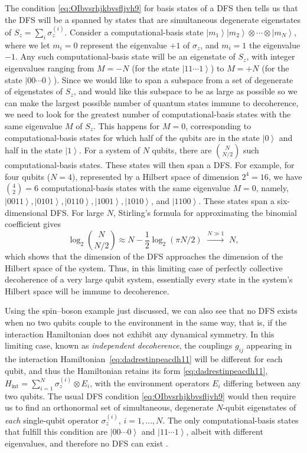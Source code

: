 \documentclass[3p,sort&compress]{elsarticle}
\newcommand{\ket}[1]{\left\vert{#1}\right\rangle}
\newcommand{\op}[1]{#1}
\begin{document}
The condition \eqref{eq:OIbvsrhjkbvsfljvh9} for basis states of a DFS then tells us that the DFS will be a spanned by states that are simultaneous degenerate eigenstates of $\op{S}_z=\sum_i \op{\sigma}_z^{(i)}$. Consider a computational-basis state $\ket{m_1}\ket{m_2} \otimes \cdots \otimes \ket{m_N}$, where we let $m_i=0$ represent the eigenvalue $+1$ of $\op{\sigma}_z$, and $m_i=1$ the eigenvalue $-1$. Any such computational-basis state will be an eigenstate of $\op{S}_z$, with integer eigenvalues ranging from $M=-N$ (for the state $\ket{11\cdots 1}$) to $M=+N$ (for the state $\ket{00\cdots 0}$). Since we would like to span a subspace from a set of degenerate of eigenstates of $\op{S}_z$, and would like this subspace to be as large as possible so we can make the largest possible number of quantum states immune to decoherence, we need to look for the greatest number of computational-basis states with the same eigenvalue $M$ of $\op{S}_z$. This happens for $M=0$, corresponding to computational-basis states for which half of the qubits are in the state $\ket{0}$ and half in the state $\ket{1}$. For a system of $N$ qubits, there are $\binom{N}{N/2}$ such computational-basis states. These states will then span a DFS. For example, for four qubits ($N=4$), represented by a Hilbert space of dimension $2^4=16$, we have $\binom{4}{2}=6$ computational-basis states with the same eigenvalue $M=0$, namely, $\ket{0011}, \ket{0101}, \ket{0110}, \ket{1001}, \ket{1010}$, and $\ket{1100}$. These states span a six-dimensional DFS. For large $N$, Stirling's formula for approximating the binomial coefficient gives 
%
\begin{equation}
 \log_2 \binom{N}{N/2} \approx N - \frac{1}{2} \log_2 (\pi N/2) \,\,
 \xrightarrow{N \gg 1} \,\, N,
\end{equation}
%
which shows that the dimension of the DFS approaches the dimension of the Hilbert space of the system. Thus, in this limiting case of perfectly collective decoherence of a very large qubit system, essentially every state in the system's Hilbert space will be immune to decoherence. 

Using the spin--boson example just discussed, we can also see that no DFS exists when no two qubits couple to the environment in the same way, that is, if the interaction Hamiltonian does not exhibit any dynamical symmetry. In this limiting case, known as \emph{independent decoherence}, the couplings $g_{ij}$ appearing in the interaction Hamiltonian~\eqref{eq:dadrestinpeacdh11} will be different for each qubit, and thus the Hamiltonian retains its form \eqref{eq:dadrestinpeacdh11}, $\op{H}_\text{int}  =  \sum_{i=1}^N  \sigma_z^{(i)} \otimes E_i$, with the environment operators $E_i$ differing between any two qubits. The usual DFS condition \eqref{eq:OIbvsrhjkbvsfljvh9} would then require us to find an orthonormal set of simultaneous, degenerate $N$-qubit eigenstates of \emph{each} single-qubit operator $\sigma_z^{(i)}$, $i=1,\hdots,N$. The only computational-basis states that fulfill this condition are $\ket{00\cdots 0}$ and $\ket{11\cdots 1}$, albeit with different eigenvalues, and therefore no DFS can exist \cite{Lidar:1998:uu}. 
\end{document}
